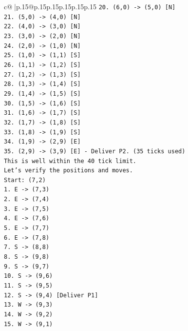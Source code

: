 \documentclass{article}
\begin{document}
{\begin{supertabular}{c@{$\;$}|p{.15\linewidth}@{}p{.15\linewidth}p{.15\linewidth}p{.15\linewidth}p{.15\linewidth}p{.15\linewidth}}
{{{\texttt{20. (6,0) {-}> (5,0) {[}N{]}} \\
\texttt{21. (5,0) {-}> (4,0) {[}N{]}} \\
\texttt{22. (4,0) {-}> (3,0) {[}N{]}} \\
\texttt{23. (3,0) {-}> (2,0) {[}N{]}} \\
\texttt{24. (2,0) {-}> (1,0) {[}N{]}} \\
\texttt{25. (1,0) {-}> (1,1) {[}S{]}} \\
\texttt{26. (1,1) {-}> (1,2) {[}S{]}} \\
\texttt{27. (1,2) {-}> (1,3) {[}S{]}} \\
\texttt{28. (1,3) {-}> (1,4) {[}S{]}} \\
\texttt{29. (1,4) {-}> (1,5) {[}S{]}} \\
\texttt{30. (1,5) {-}> (1,6) {[}S{]}} \\
\texttt{31. (1,6) {-}> (1,7) {[}S{]}} \\
\texttt{32. (1,7) {-}> (1,8) {[}S{]}} \\
\texttt{33. (1,8) {-}> (1,9) {[}S{]}} \\
\texttt{34. (1,9) {-}> (2,9) {[}E{]}} \\
\texttt{35. (2,9) {-}> (3,9) {[}E{]} {-} Deliver P2. (35 ticks used)} \\
\texttt{This is well within the 40 tick limit.} \\
\texttt{Let's verify the positions and moves.} \\
\texttt{Start: (7,2)} \\
\texttt{1. E {-}> (7,3)} \\
\texttt{2. E {-}> (7,4)} \\
\texttt{3. E {-}> (7,5)} \\
\texttt{4. E {-}> (7,6)} \\
\texttt{5. E {-}> (7,7)} \\
\texttt{6. E {-}> (7,8)} \\
\texttt{7. S {-}> (8,8)} \\
\texttt{8. S {-}> (9,8)} \\
\texttt{9. S {-}> (9,7)} \\
\texttt{10. S {-}> (9,6)} \\
\texttt{11. S {-}> (9,5)} \\
\texttt{12. S {-}> (9,4) {[}Deliver P1{]}} \\
\texttt{13. W {-}> (9,3)} \\
\texttt{14. W {-}> (9,2)} \\
\texttt{15. W {-}> (9,1)} \\
}}}
\end{supertabular}}
\end{document}

